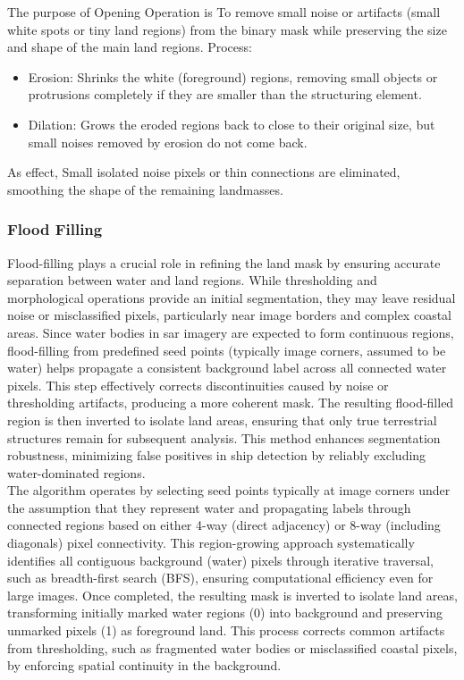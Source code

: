 \documentclass{article}
\begin{document}
	
	The purpose of Opening Operation is To remove small noise or artifacts (small white spots or tiny land regions) from the binary mask while preserving the size and shape of the main land regions. Process:
	\begin{itemize}
		\item Erosion: Shrinks the white (foreground) regions, removing small objects or protrusions completely if they are smaller than the structuring element. \item Dilation: Grows the eroded regions back to close to their original size, but small noises removed by erosion do not come back. \end{itemize}
	As effect, Small isolated noise pixels or thin connections are eliminated, smoothing the shape of the remaining landmasses. 
	
	\subsubsection{Flood Filling}
	
	Flood-filling plays a crucial role in refining the land mask by ensuring accurate separation between water and land regions. While thresholding and morphological operations provide an initial segmentation, they may leave residual noise or misclassified pixels, particularly near image borders and complex coastal areas. Since water bodies in \acrshort{sar} imagery are expected to form continuous regions, flood-filling from predefined seed points (typically image corners, assumed to be water) helps propagate a consistent background label across all connected water pixels. This step effectively corrects discontinuities caused by noise or thresholding artifacts, producing a more coherent mask. The resulting flood-filled region is then inverted to isolate land areas, ensuring that only true terrestrial structures remain for subsequent analysis. This method enhances segmentation robustness, minimizing false positives in ship detection by reliably excluding water-dominated regions.\\
	
	The algorithm operates by selecting seed points typically at image corners under the assumption that they represent water and propagating labels through connected regions based on either 4-way (direct adjacency) or 8-way (including diagonals) pixel connectivity. This region-growing approach systematically identifies all contiguous background (water) pixels through iterative traversal, such as breadth-first search (BFS), ensuring computational efficiency even for large images. Once completed, the resulting mask is inverted to isolate land areas, transforming initially marked water regions (0) into background and preserving unmarked pixels (1) as foreground land. This process corrects common artifacts from thresholding, such as fragmented water bodies or misclassified coastal pixels, by enforcing spatial continuity in the background.\\
	
\end{document}
